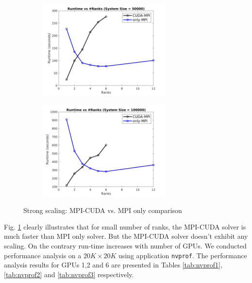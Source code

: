 \documentclass[sigplan,screen]{acmart}
\begin{document}
\begin{figure}
	\begin{subfigure}{0.3\textwidth}
		\includegraphics[trim= 10 5 35 10,clip, width=0.95\linewidth, height=5cm]{plots/compare_strong_50k.png} 
		\caption{}
	\end{subfigure}
	\begin{subfigure}{0.3\textwidth}
		\includegraphics[trim= 10 5 35 10,clip, width=0.95\linewidth, height=5cm]{plots/compare_strong_100k.png}
		\caption{}
	\end{subfigure}
	\caption{Strong scaling: MPI-CUDA vs. MPI only comparison}
	\label{compare_strong}
\end{figure}

Fig. \ref{compare_strong} clearly illustrates that for small number of ranks, the MPI-CUDA solver is much faster than MPI only solver. But the MPI-CUDA solver doesn't exhibit any scaling. On the contrary run-time increases with number of GPUs. We conducted performance analysis on a $20K\times 20K$ using application \texttt{nvprof}. The performance analysis results for GPUs 1,2 and 6 are presented in Tables \ref{tab:nvprof1}, \ref{tab:nvprof2} and \ref{tab:nvprof3} respectively.  
\end{document}
